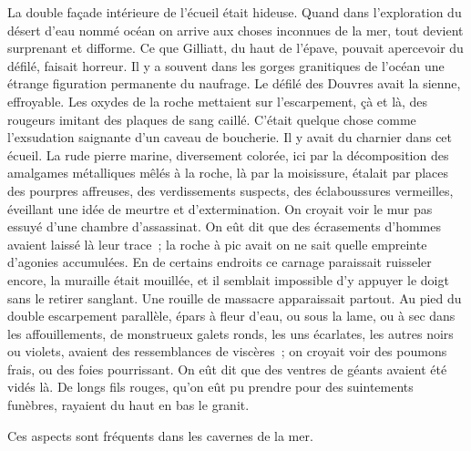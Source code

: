 \documentclass[french,twoside]{book} %
\begin{document}
 La double façade intérieure de l’écueil était hideuse. Quand dans l’exploration du désert d’eau nommé océan on arrive aux choses inconnues de la mer, tout devient surprenant et difforme. Ce que Gilliatt, du haut de l’épave, pouvait apercevoir du défilé, faisait horreur. Il y a souvent dans les gorges granitiques de l’océan une étrange figuration permanente du naufrage. Le défilé des Douvres avait la sienne, effroyable. Les oxydes de la roche mettaient sur l’escarpement, çà et là, des rougeurs imitant des plaques de sang caillé. C’était quelque chose comme l’exsudation saignante d’un caveau de boucherie. Il y avait du charnier dans cet écueil. La rude pierre marine, diversement colorée, ici par la décomposition des amalgames métalliques mêlés à la roche, là par la moisissure, étalait par places des pourpres affreuses, des verdissements suspects, des éclaboussures vermeilles, éveillant une idée de meurtre et d’extermination. On croyait voir le mur pas essuyé d’une chambre d’assassinat. On eût dit que des écrasements d’hommes avaient laissé là leur trace ; la roche à pic avait on ne sait quelle empreinte d’agonies accumulées. En de certains endroits ce carnage paraissait ruisseler encore, la muraille était mouillée, et il semblait impossible d’y appuyer le doigt sans le retirer sanglant. Une rouille de massacre apparaissait partout. Au pied du double escarpement parallèle, épars à fleur d’eau, ou sous la lame, ou à sec dans les affouillements, de monstrueux galets ronds, les uns écarlates, les autres noirs ou violets, avaient des ressemblances de viscères ; on croyait voir des poumons  frais, ou des foies pourrissant. On eût dit que des ventres de géants avaient été vidés là. De longs fils rouges, qu’on eût pu prendre pour des suintements funèbres, rayaient du haut en bas le granit.\par
Ces aspects sont fréquents dans les cavernes de la mer.
\end{document}
